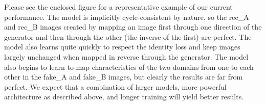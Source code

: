 \documentclass{article}
\begin{document}
Please see the enclosed figure for a representative example of our current performance. The model is implicitly cycle-consistent by nature, so the rec\_A and rec\_B images created by mapping an image first through one direction of the generator and then through the other (the inverse of the first) are perfect. The model also learns quite quickly to respect the identity loss and keep images largely unchanged when mapped in reverse through the generator. The model also begins to learn to map characteristics of the two domains from one to each other in the fake\_A and fake\_B images, but clearly the results are far from perfect. We expect that a combination of larger models, more powerful architecture as described above, and longer training will yield better results.



\appendix
\end{document}
